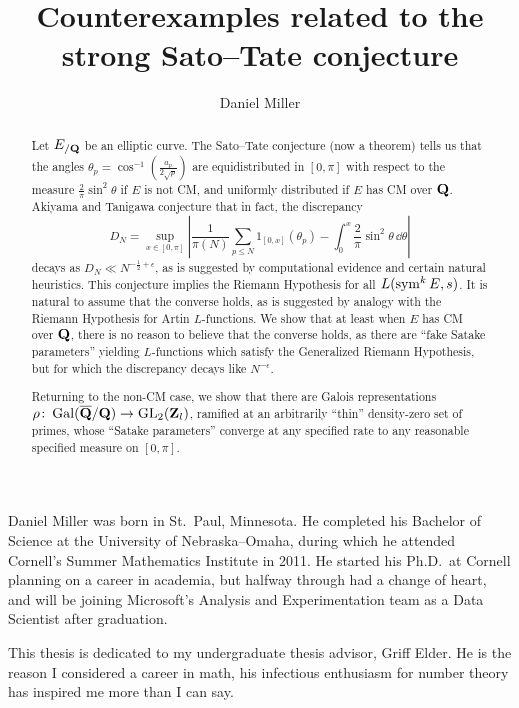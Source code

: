 \documentclass[phd,cornellheadings]{cornell}
\title{Counterexamples related to the strong Sato--Tate conjecture}
\author{Daniel Miller}
\begin{document}
\maketitle
\makecopyright

\begin{abstract}
Let $E_{/\mathbf{Q}}$ be an elliptic curve. The Sato--Tate conjecture (now a theorem) 
tells us that the angles $\theta_p =\cos^{-1}\left(\frac{a_p}{2\sqrt p}\right)$ 
are equidistributed in $[0,\pi]$ with respect to the measure 
$\frac{2}{\pi}\sin^2\theta$ if $E$ is not CM, and uniformly distributed if 
$E$ has CM over $\mathbf{Q}$. Akiyama and Tanigawa conjecture that in fact, the 
discrepancy 
\[
	D_N = \sup_{x\in [0,\pi]} \left| \frac{1}{\pi(N)} \sum_{p\leqslant N} 1_{[0,x]}(\theta_p) - \int_0^x \frac{2}{\pi} \sin^2\theta\, \dd\theta\right| 
\]
decays as $D_N \ll N^{-\frac 1 2+\epsilon}$, as is suggested by computational 
evidence and certain natural heuristics. This conjecture implies the Riemann 
Hypothesis for all $L(\operatorname{sym}^k E,s)$. It is natural to assume that the converse 
holds, as is suggested by analogy with the Riemann Hypothesis for Artin 
$L$-functions. We show that at least when $E$ has CM over $\mathbf{Q}$, there is no 
reason to believe that the converse holds, as there are ``fake Satake 
parameters'' yielding $L$-functions which satisfy the Generalized Riemann 
Hypothesis, but for which the discrepancy decays like $N^{-\epsilon}$. 

Returning to the non-CM case, we show that there are Galois representations 
$\rho\colon \operatorname{Gal}(\overline {\mathbf{Q}} /\mathbf{Q}) \to \operatorname{GL}_2(\mathbf{Z}_l)$, ramified at an 
arbitrarily ``thin'' density-zero set of primes, whose ``Satake parameters'' 
converge at any specified rate to any reasonable specified measure on 
$[0,\pi]$. 
\end{abstract}

\begin{biosketch}
Daniel Miller was born in St.~Paul, Minnesota. He completed his Bachelor of 
Science at the University of Nebraska--Omaha, during which he attended 
Cornell's Summer Mathematics Institute in 2011. He started his Ph.D.~at 
Cornell planning on a career in academia, but halfway through had a change of 
heart, and will be joining Microsoft's Analysis and Experimentation team as a 
Data Scientist after graduation. 
\end{biosketch}

\begin{dedication}
This thesis is dedicated to my undergraduate thesis advisor, Griff Elder. 
He is the reason I considered a career in math, his infectious enthusiasm for 
number theory has inspired me more than I can say. 
\end{dedication}
\end{document}
